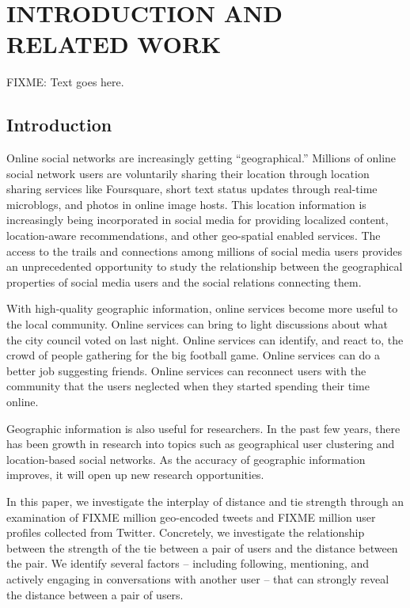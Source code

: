 \pagestyle{plain} %
\setcounter{page}{1}


\chapter{\uppercase {Introduction and Related Work}}

FIXME: Text goes here.

\section{Introduction}

Online social networks are increasingly getting ``geographical.'' Millions of online
social network users are voluntarily sharing their location through location sharing
services like Foursquare, short text status updates
through real-time microblogs, and photos in online image hosts. This location
information is increasingly being
incorporated in social media for providing localized content, location-aware
recommendations, and other geo-spatial enabled services. The access to the
trails and connections among millions of social media users provides an
unprecedented opportunity to study the relationship between the geographical
properties of social media users and the social relations connecting them.

With high-quality geographic information, online services become more useful to
the local community.  Online services can bring to light discussions about what
the city council voted on last night.  Online services can identify, and react
to, the crowd of people gathering for the big football game.  Online services
can do a better job suggesting friends.  Online services can reconnect users
with the community that the users neglected when they started spending their
time online.

Geographic information is also useful for researchers.  In the past few years,
there has been growth in research into topics such as geographical user
clustering and location-based social networks.  As the accuracy of geographic
information improves, it will open up new research opportunities.

In this paper, we investigate the interplay of distance and tie strength
through an examination of FIXME million geo-encoded tweets and FIXME million user
profiles collected from Twitter. Concretely, we investigate the relationship
between the strength of the tie between a pair of users and the distance
between the pair.  We identify several factors -- including following,
mentioning, and actively engaging in conversations with another user -- that
can strongly reveal the distance between a pair of users.

